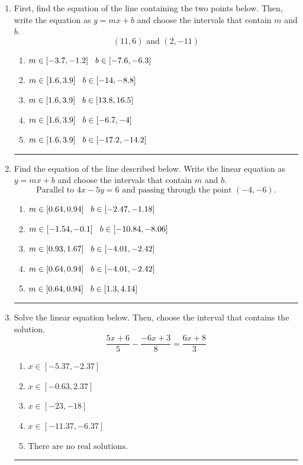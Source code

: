 \documentclass[14pt]{extbook}
\newcommand{\litem}[1]{\item#1\hspace*{-1cm}\rule{\textwidth}{0.4pt}}
\begin{document}
\begin{enumerate}
{\begin{enumerate}[label=\Alph*.]
\end{enumerate} }
\litem{
First, find the equation of the line containing the two points below. Then, write the equation as $ y=mx+b $ and choose the intervals that contain $m$ and $b$.\[ (11, 6) \text{ and } (2, -11) \]\begin{enumerate}[label=\Alph*.]
\item \( m \in [-3.7, -1.2] \hspace*{3mm} b \in [-7.6, -6.3] \)
\item \( m \in [1.6, 3.9] \hspace*{3mm} b \in [-14, -8.8] \)
\item \( m \in [1.6, 3.9] \hspace*{3mm} b \in [13.8, 16.5] \)
\item \( m \in [1.6, 3.9] \hspace*{3mm} b \in [-6.7, -4] \)
\item \( m \in [1.6, 3.9] \hspace*{3mm} b \in [-17.2, -14.2] \)

\end{enumerate} }
\litem{
Find the equation of the line described below. Write the linear equation as $ y=mx+b $ and choose the intervals that contain $m$ and $b$.\[ \text{Parallel to } 4 x - 5 y = 6 \text{ and passing through the point } (-4, -6). \]\begin{enumerate}[label=\Alph*.]
\item \( m \in [0.64, 0.94] \hspace*{3mm} b \in [-2.47, -1.18] \)
\item \( m \in [-1.54, -0.1] \hspace*{3mm} b \in [-10.84, -8.06] \)
\item \( m \in [0.93, 1.67] \hspace*{3mm} b \in [-4.01, -2.42] \)
\item \( m \in [0.64, 0.94] \hspace*{3mm} b \in [-4.01, -2.42] \)
\item \( m \in [0.64, 0.94] \hspace*{3mm} b \in [1.3, 4.14] \)

\end{enumerate} }
\litem{
Solve the linear equation below. Then, choose the interval that contains the solution.\[ \frac{5x + 6}{5} - \frac{-6x + 3}{8} = \frac{6x + 8}{3} \]\begin{enumerate}[label=\Alph*.]
\item \( x \in [-5.37, -2.37] \)
\item \( x \in [-0.63, 2.37] \)
\item \( x \in [-23, -18] \)
\item \( x \in [-11.37, -6.37] \)
\item \( \text{There are no real solutions.} \)


\end{enumerate}}
\end{enumerate}
\end{document}
